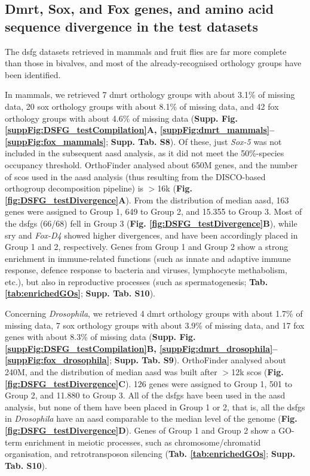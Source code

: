 \documentclass[../main.tex]{subfiles}
\begin{document}
\subsection{Dmrt, Sox, and Fox genes, and amino acid sequence divergence in the test datasets}
The \gls{dsfg} datasets retrieved in mammals and fruit flies are far more complete than those in bivalves, and most of the already-recognised orthology groups have been identified.

In mammals, we retrieved 7 \gls{dmrt} orthology groups with about 3.1\% of missing data, 20 \gls{sox} orthology groups with about 8.1\% of missing data, and 42 \gls{fox} orthology groups with about 4.6\% of missing data (\textbf{Supp. Fig. \ref{suppFig:DSFG_testCompilation}A, \ref{suppFig:dmrt_mammals}--\ref{suppFig:fox_mammals}}; \textbf{Supp. Tab. S8}). Of these, just \textit{Sox-5} was not included in the subsequent \gls{aasd} analysis, as it did not meet the 50\%-species occupancy threshold. OrthoFinder analysed about 650M genes, and the number of \glspl{sco} used in the \gls{aasd} analysis (thus resulting from the DISCO-based orthogroup decomposition pipeline) is $>$16k (\textbf{Fig. \ref{fig:DSFG_testDivergence}A}). From the distribution of median \gls{aasd}, 163 genes were assigned to Group 1, 649 to Group 2, and 15.355 to Group 3. Most of the \glspl{dsfg} (66/68) fell in Group 3 (\textbf{Fig. \ref{fig:DSFG_testDivergence}B}), while \gls{sry} and \textit{Fox-D4} showed higher divergences, and have been accordingly placed in Group 1 and 2, respectively. Genes from Group 1 and Group 2 show a strong enrichment in immune-related functions (such as innate and adaptive immune response, defence response to bacteria and viruses, lymphocyte methabolism, etc.), but also in reproductive processes (such as spermatogenesis; \textbf{Tab. \ref{tab:enrichedGOs}}; \textbf{Supp. Tab. S10}).

Concerning \textit{Drosophila}, we retrieved 4 \gls{dmrt} orthology groups with about 1.7\% of missing data, 7 \gls{sox} orthology groups with about 3.9\% of missing data, and 17 \gls{fox} genes with about 8.3\% of missing data (\textbf{Supp. Fig. \ref{suppFig:DSFG_testCompilation}B, \ref{suppFig:dmrt_drosophila}--\ref{suppFig:fox_drosophila}}; \textbf{Supp. Tab. S9}). OrthoFinder analysed about 240M, and the distribution of median \gls{aasd} was built after $>$12k \glspl{sco} (\textbf{Fig. \ref{fig:DSFG_testDivergence}C}). 126 genes were assigned to Group 1, 501 to Group 2, and 11.880 to Group 3. All of the \glspl{dsfg} have been used in the \gls{aasd} analysis, but none of them have been placed in Group 1 or 2, that is, all the \glspl{dsfg} in \textit{Drosophila} have an \gls{aasd} comparable to the median level of the genome (\textbf{Fig. \ref{fig:DSFG_testDivergence}D}). Genes of Group 1 and Group 2 show a GO-term enrichment in meiotic processes, such as chromosome/chromatid organisation, and retrotransposon silencing (\textbf{Tab. \ref{tab:enrichedGOs}}; \textbf{Supp. Tab. S10}).
\end{document}
